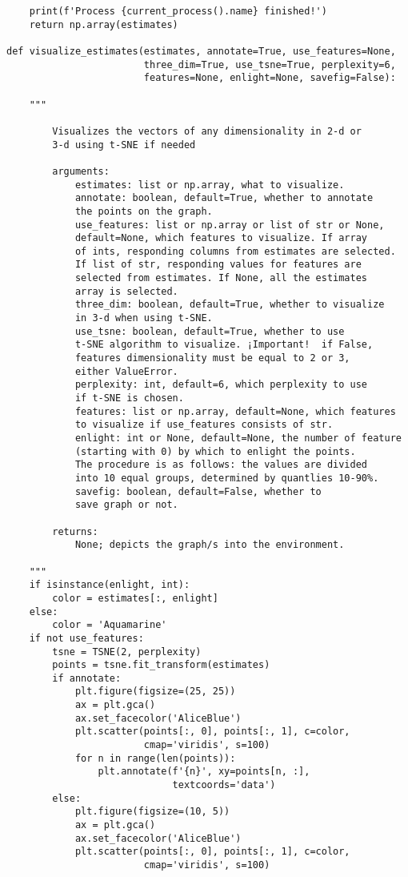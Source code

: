 \documentclass[a4paper, 12pt]{extreport}
\begin{document}
\begin{verbatim}
    print(f'Process {current_process().name} finished!')
    return np.array(estimates)

def visualize_estimates(estimates, annotate=True, use_features=None,
                        three_dim=True, use_tsne=True, perplexity=6,
                        features=None, enlight=None, savefig=False):

    """

        Visualizes the vectors of any dimensionality in 2-d or
        3-d using t-SNE if needed

        arguments:
            estimates: list or np.array, what to visualize.
            annotate: boolean, default=True, whether to annotate
            the points on the graph.
            use_features: list or np.array or list of str or None,
            default=None, which features to visualize. If array
            of ints, responding columns from estimates are selected.
            If list of str, responding values for features are
            selected from estimates. If None, all the estimates
            array is selected.
            three_dim: boolean, default=True, whether to visualize
            in 3-d when using t-SNE.
            use_tsne: boolean, default=True, whether to use
            t-SNE algorithm to visualize. ¡Important!  if False,
            features dimensionality must be equal to 2 or 3,
            either ValueError.
            perplexity: int, default=6, which perplexity to use
            if t-SNE is chosen.
            features: list or np.array, default=None, which features
            to visualize if use_features consists of str.
            enlight: int or None, default=None, the number of feature
            (starting with 0) by which to enlight the points.
            The procedure is as follows: the values are divided
            into 10 equal groups, determined by quantlies 10-90%.
            savefig: boolean, default=False, whether to
            save graph or not.

        returns:
            None; depicts the graph/s into the environment.

    """
    if isinstance(enlight, int):
        color = estimates[:, enlight]
    else:
        color = 'Aquamarine'
    if not use_features:
        tsne = TSNE(2, perplexity)
        points = tsne.fit_transform(estimates)
        if annotate:
            plt.figure(figsize=(25, 25))
            ax = plt.gca()
            ax.set_facecolor('AliceBlue')
            plt.scatter(points[:, 0], points[:, 1], c=color,
                        cmap='viridis', s=100)
            for n in range(len(points)):
                plt.annotate(f'{n}', xy=points[n, :],
                             textcoords='data')
        else:
            plt.figure(figsize=(10, 5))
            ax = plt.gca()
            ax.set_facecolor('AliceBlue')
            plt.scatter(points[:, 0], points[:, 1], c=color,
                        cmap='viridis', s=100)


\end{verbatim}
\end{document}

